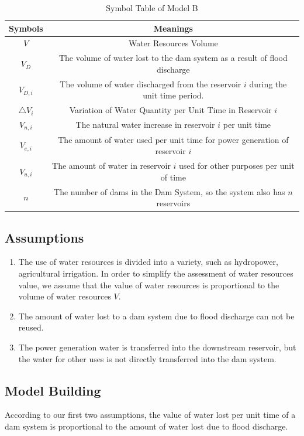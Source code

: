 \documentclass{mcmthesis}
\begin{document}
\begin{table}[h]
\centering
  \begin{tabular}{cc}
  \hline
  Symbols & Meanings \\
  \hline
  $V$ & Water Resources Volume \\
  $V_{D}$ & The volume of water lost to the dam system as a result of flood discharge \\
  $V_{D,i}$ & The volume of water discharged from the reservoir $i$ during the unit time period.\\
  $\triangle V_{i}$ & Variation of Water Quantity per Unit Time in Reservoir $i$\\
  $V_{n, i}$ & The natural water increase in reservoir $i$ per unit time \\
  $V_{e, i}$ & The amount of water used per unit time for power generation of reservoir $i$\\
  $V_{u, i}$ & The amount of water in reservoir $i$ used for other purposes per unit of time \\
  $n$ & The number of dams in the Dam System, so the system also has $n$ reservoirs \\
  \hline
  \end{tabular}
\caption{Symbol Table of Model B}
\end{table}

\subsection{Assumptions}
\begin{enumerate}
  \item The use of water resources is divided into a variety, such as hydropower, agricultural irrigation. In order to simplify the assessment of water resources value, we assume that the value of water resources is proportional to the volume of water resources $V$. 
  \item The amount of water lost to a dam system due to flood discharge can not be reused.
  \item The power generation water is transferred into the downstream reservoir, but the water for other uses is not directly transferred into the dam system.
\end{enumerate}

\subsection{Model Building}
According to our first two assumptions, the value of water lost per unit time of a dam system is proportional to the amount of water lost due to flood discharge. 
\end{document}
